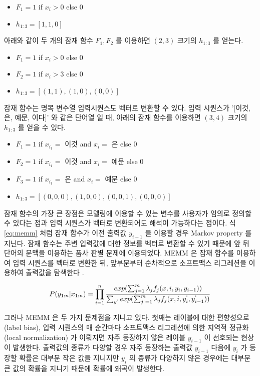 \documentclass[oneside, ko,phd]{snuthesis_utf8_kor}
\begin{document}
\begin{itemize}
  \item $F_1 = 1$ if $x_i > 0$ else $0$
  \item $h_{1:3} = [1, 1, 0]$
\end{itemize}

아래와 같이 두 개의 잠재 함수 $F_1, F_2$ 를 이용하면 $(2, 3)$ 크기의 $h_{1:3}$ 를 얻는다.

\begin{itemize}
  \item $F_1 = 1$ if $x_i > 0$ else $0$
  \item $F_2 = 1$ if $x_i > 3$ else $0$
  \item $h_{1:3} = [(1, 1), (1, 0), (0, 0)]$
\end{itemize}

잠재 함수는 명목 변수열 입력시퀀스도 벡터로 변환할 수 있다.
입력 시퀀스가 '[이것, 은, 예문, 이다]' 와 같은 단어열 일 때, 아래의 잠재 함수를 이용하면 $(3, 4)$ 크기의 $h_{1:3}$ 를 얻을 수 있다.

\begin{itemize}
  \item $F_1 = 1$ if $x_{i_1} =$ 이것 and $x_{i} =$ 은 else $0$
  \item $F_2 = 1$ if $x_{i_1} =$ 이것 and $x_{i} =$ 예문 else $0$
  \item $F_3 = 1$ if $x_{i_1} =$ 은 and $x_{i} =$ 예문 else $0$
  \item $h_{1:3} = [(0, 0, 0), (1, 0, 0), (0, 0, 1), (0, 0, 0)]$
\end{itemize}

잠재 함수의 가장 큰 장점은 모델링에 이용할 수 있는 변수를 사용자가 임의로 정의할 수 있다는 점과 입력 시퀀스가 벡터로 변환되어도 해석이 가능하다는 점이다.
식 \ref{eq:memm} 처럼 잠재 함수가 이전 출력값 $y_{i-1}$ 을 이용할 경우 Markov property 를 지닌다.
잠재 함수는 주변 입력값에 대한 정보를 벡터로 변환할 수 있기 때문에 앞 뒤 단어의 문맥을 이용하는 품사 판별 문제에 이용되었다.
MEMM 은 잠재 함수를 이용하여 입력 시퀀스를 벡터로 변환한 뒤, 앞부분부터 순차적으로 소프트맥스 리그레션을 이용하여 출력값을 탐색한다 \cite{mccallum2000maximum}.

\begin{equation}
  \label{eq:memm}
  P(y_{1:n} \vert x_{1:n}) = \prod_{i=1}^{n} \frac{exp(\sum_{j=1}^{m} \lambda_j f_j (x, i, y_i, y_{i-1}))}{ \sum_{y^{`}} exp(\sum_{j^{`}=1}^{m} \lambda_j f_j (x, i, y_i^{`}, y_{i-1}^{`})) }
\end{equation}

그러나 MEMM 은 두 가지 문제점을 지니고 있다.
첫째는 레이블에 대한 편향성으로 (label bias), 입력 시퀀스의 매 순간마다 소프트맥스 리그레션에 의한 지역적 정규화 (local normalization) 가 이뤄지면 자주 등장하지 않은 레이블 $y_{i-1}$ 이 선호되는 현상이 발생한다\cite{lafferty2001conditional, kudo2004applying, andor2016globally}.
출력값의 종류가 다양할 경우 자주 등장하는 출력값 $y_{i-1}$ 다음에 $y_i$ 가 등장할 확률은 대부분 작은 값을 지니지만 $y_i$ 의 종류가 다양하지 않은 경우에는 대부분 큰 값의 확률을 지니기 때문에 확률에 왜곡이 발생한다.
\end{document}
